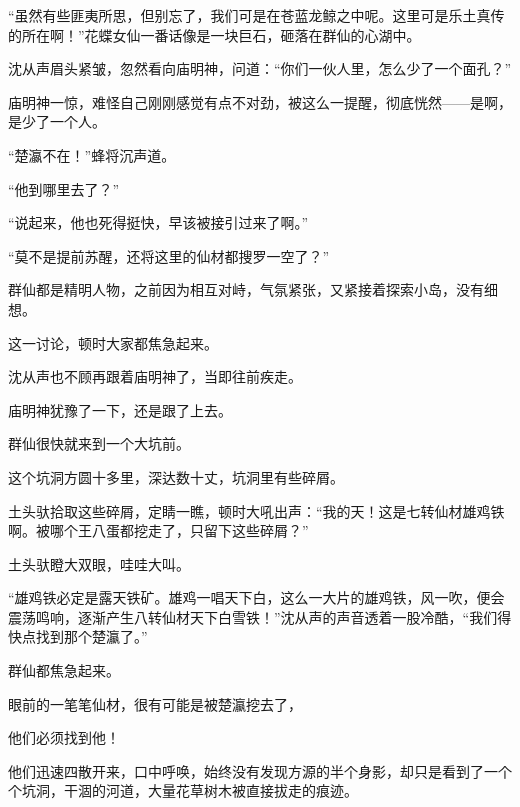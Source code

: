 \begin{this_body}
“虽然有些匪夷所思，但别忘了，我们可是在苍蓝龙鲸之中呢。这里可是乐土真传的所在啊！”花蝶女仙一番话像是一块巨石，砸落在群仙的心湖中。

沈从声眉头紧皱，忽然看向庙明神，问道：“你们一伙人里，怎么少了一个面孔？”

庙明神一惊，难怪自己刚刚感觉有点不对劲，被这么一提醒，彻底恍然——是啊，是少了一个人。

“楚瀛不在！”蜂将沉声道。

“他到哪里去了？”

“说起来，他也死得挺快，早该被接引过来了啊。”

“莫不是提前苏醒，还将这里的仙材都搜罗一空了？”

群仙都是精明人物，之前因为相互对峙，气氛紧张，又紧接着探索小岛，没有细想。

这一讨论，顿时大家都焦急起来。

沈从声也不顾再跟着庙明神了，当即往前疾走。

庙明神犹豫了一下，还是跟了上去。

群仙很快就来到一个大坑前。

这个坑洞方圆十多里，深达数十丈，坑洞里有些碎屑。

土头驮拾取这些碎屑，定睛一瞧，顿时大吼出声：“我的天！这是七转仙材雄鸡铁啊。被哪个王八蛋都挖走了，只留下这些碎屑？”

土头驮瞪大双眼，哇哇大叫。

“雄鸡铁必定是露天铁矿。雄鸡一唱天下白，这么一大片的雄鸡铁，风一吹，便会震荡鸣响，逐渐产生八转仙材天下白雪铁！”沈从声的声音透着一股冷酷，“我们得快点找到那个楚瀛了。”

群仙都焦急起来。

眼前的一笔笔仙材，很有可能是被楚瀛挖去了，

他们必须找到他！

他们迅速四散开来，口中呼唤，始终没有发现方源的半个身影，却只是看到了一个个坑洞，干涸的河道，大量花草树木被直接拔走的痕迹。

\end{this_body}

